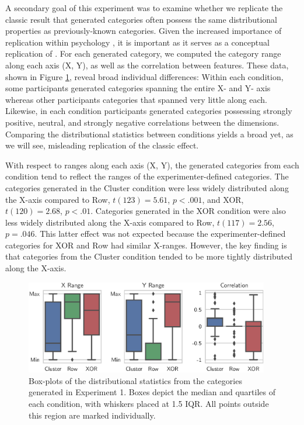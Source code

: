 \documentclass[pdflatex,sn-apa]{sn-jnl}%
\theoremstyle{thmstyleone}%
\theoremstyle{thmstyletwo}%
\theoremstyle{thmstylethree}%
\begin{document}
A secondary goal of this experiment was to examine whether we replicate the
classic result that generated categories often possess the same distributional
properties as previously-known categories. Given the increased importance of
replication within psychology \citep{zwaan2018making}, it is important as it
serves as a conceptual replication of \citet{jern2013probabilistic}. For each
generated category, we computed the category range along each axis (X, Y), as
well as the correlation between features. These data, shown in Figure
\ref{fig:e1-statsboxes}, reveal broad individual differences: Within each
condition, some participants generated categories spanning the entire X- and Y-
axis whereas other participants categories that spanned very little along each.
Likewise, in each condition participants generated categories possessing
strongly positive, neutral, and strongly negative correlations between the
dimensions. Comparing the distributional statistics between conditions yields a
broad yet, as we will see, misleading replication of the classic effect.

With respect to ranges along each axis (X, Y), the generated categories from
each condition tend to reflect the ranges of the experimenter-defined
categories. The categories generated in the Cluster condition were less widely
distributed along the X-axis compared to Row, $t(123) = 5.61$, $p < .001$, and
XOR, $t(120) = 2.68$, $p < .01$. Categories generated in the XOR condition
were also less widely distributed along the X-axis compared to Row, $t(117) =
2.56$, $p = .046$. This latter effect was not expected because the
experimenter-defined categories for XOR and Row had similar X-ranges. However,
the key finding is that categories from the Cluster condition tended to be more
tightly distributed along the X-axis.

\begin{figure}
    \begin{center} \includegraphics[width=0.95\textwidth]{figs/e1-statsboxes.eps}
    \caption{Box-plots of the distributional statistics from the categories
generated in Experiment 1. Boxes depict the median and quartiles of each
condition, with whiskers placed at 1.5 IQR. All points outside this region are
marked individually.}
    \label{fig:e1-statsboxes}
    \end{center}
\end{figure}
\end{document}
